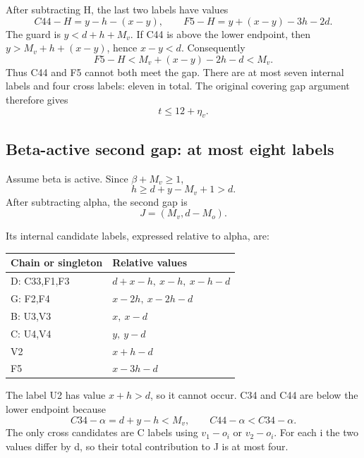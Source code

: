 \documentclass[10pt,a4paper]{article}
\theoremstyle{definition}
\begin{document}
After subtracting H,\allowbreak{} the last two labels have values \[
C44-H=\allowbreak{}y-h-(x-y),\allowbreak{}\qquad F5-H=\allowbreak{}y+\allowbreak{}(x-y)-3h-2d.
\] The guard is \(y<d+\allowbreak{}h+\allowbreak{}M_v\). If C44 is above the lower endpoint,\allowbreak{} then
\(y>M_v+\allowbreak{}h+\allowbreak{}(x-y)\),\allowbreak{} hence \(x-y<d\). Consequently \[
F5-H<M_v+\allowbreak{}(x-y)-2h-d<M_v.
\] Thus C44 and F5 cannot both meet the gap. There are at most seven
internal labels and four cross labels: eleven in total. The original
covering gap argument therefore gives \[
t\le12+\allowbreak{}\eta_v.\tag{1}
\]

\hypertarget{beta-active-second-gap-at-most-eight-labels}{%
\subsection{Beta-active second gap: at most eight
labels}\label{beta-active-second-gap-at-most-eight-labels}}

Assume beta is active. Since \(\beta+\allowbreak{}M_v\ge1\),\allowbreak{} \[
h\ge d+\allowbreak{}y-M_v+\allowbreak{}1>d.
\] After subtracting alpha,\allowbreak{} the second gap is \[
J=\allowbreak{}(M_v,\allowbreak{}d-M_o).
\]

Its internal candidate labels,\allowbreak{} expressed relative to alpha,\allowbreak{} are:

\begin{longtable}[]{@{}ll@{}}
\toprule\noalign{}
Chain or singleton & Relative values \\
\midrule\noalign{}
\endhead
\bottomrule\noalign{}
\endlastfoot
D: C33,\allowbreak{}F1,\allowbreak{}F3 & \(d+\allowbreak{}x-h,\allowbreak{}\ x-h,\allowbreak{}\ x-h-d\) \\
G: F2,\allowbreak{}F4 & \(x-2h,\allowbreak{}\ x-2h-d\) \\
B: U3,\allowbreak{}V3 & \(x,\allowbreak{}\ x-d\) \\
C: U4,\allowbreak{}V4 & \(y,\allowbreak{}\ y-d\) \\
V2 & \(x+\allowbreak{}h-d\) \\
F5 & \(x-3h-d\) \\
\end{longtable}

The label U2 has value \(x+\allowbreak{}h>d\),\allowbreak{} so it cannot occur. C34 and C44 are
below the lower endpoint because \[
C34-\alpha=\allowbreak{}d+\allowbreak{}y-h<M_v,\allowbreak{}\qquad C44-\alpha<C34-\alpha.
\] The only cross candidates are C labels using \(v_1-o_i\) or
\(v_2-o_i\). For each i the two values differ by d,\allowbreak{} so their total
contribution to J is at most four.
\end{document}
